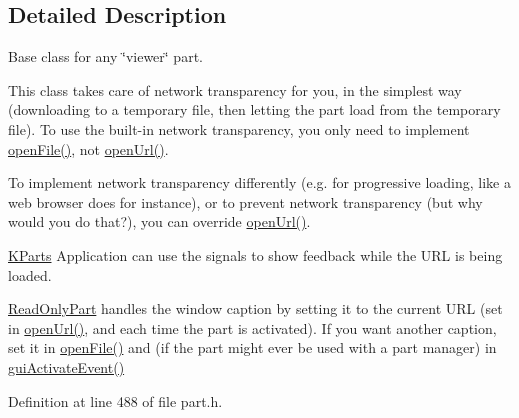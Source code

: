 \subsection{Detailed Description}
Base class for any \char`\"{}viewer\char`\"{} part.

This class takes care of network transparency for you, in the simplest way (downloading to a temporary file, then letting the part load from the temporary file). To use the built-\/in network transparency, you only need to implement \hyperlink{classKParts_1_1ReadOnlyPart_a951a032497fb94b092dfd4fd134db09b}{open\+File()}, not \hyperlink{classKParts_1_1ReadOnlyPart_a1ff41b28f8da57ccc380e0c092a50c0c}{open\+Url()}.

To implement network transparency differently (e.\+g. for progressive loading, like a web browser does for instance), or to prevent network transparency (but why would you do that?), you can override \hyperlink{classKParts_1_1ReadOnlyPart_a1ff41b28f8da57ccc380e0c092a50c0c}{open\+Url()}.

\hyperlink{namespaceKParts}{K\+Parts} Application can use the signals to show feedback while the U\+R\+L is being loaded.

\hyperlink{classKParts_1_1ReadOnlyPart}{Read\+Only\+Part} handles the window caption by setting it to the current U\+R\+L (set in \hyperlink{classKParts_1_1ReadOnlyPart_a1ff41b28f8da57ccc380e0c092a50c0c}{open\+Url()}, and each time the part is activated). If you want another caption, set it in \hyperlink{classKParts_1_1ReadOnlyPart_a951a032497fb94b092dfd4fd134db09b}{open\+File()} and (if the part might ever be used with a part manager) in \hyperlink{classKParts_1_1ReadOnlyPart_aa5ac9f161aef38a92bbf25891746cac0}{gui\+Activate\+Event()} 

Definition at line 488 of file part.\+h.



